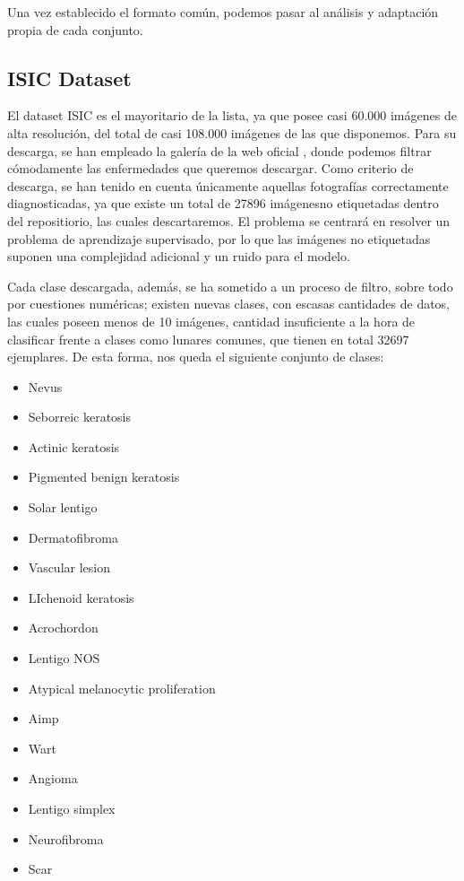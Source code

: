 Una vez establecido el formato común, podemos pasar al análisis y adaptación propia de cada conjunto.

\subsection{ISIC Dataset}

El dataset ISIC es el mayoritario de la lista, ya que posee casi 60.000 imágenes de alta resolución, del total de casi 108.000 imágenes de las que disponemos. Para su descarga, se han empleado la galería de la web oficial \cite{isicarchive}, donde podemos filtrar cómodamente las enfermedades que queremos descargar. Como criterio de descarga, se han tenido en cuenta únicamente aquellas fotografías correctamente diagnosticadas, ya que existe un total de 27896 imágenesno etiquetadas dentro del repositiorio, las cuales descartaremos. El problema se centrará en resolver un problema de aprendizaje supervisado, por lo que las imágenes no etiquetadas suponen una complejidad adicional y un ruido para el modelo.

Cada clase descargada, además, se ha sometido a un proceso de filtro, sobre todo por cuestiones numéricas; existen nuevas clases, con escasas cantidades de datos, las cuales poseen menos de 10 imágenes, cantidad insuficiente a la hora de clasificar frente a clases como lunares comunes, que tienen en total 32697 ejemplares. De esta forma, nos queda el siguiente conjunto de clases:
\begin{itemize}
	\item Nevus
	\item Seborreic keratosis            
	 \item Actinic keratosis            
	\item Pigmented benign keratosis         
	\item Solar lentigo                           
	\item Dermatofibroma                          
	\item Vascular lesion                         
	\item LIchenoid keratosis                     
	\item Acrochordon                             
	\item Lentigo NOS                             
	\item Atypical melanocytic proliferation       
	\item Aimp                                     
	\item 	Wart                                     
	\item Angioma                                  
	\item Lentigo simplex                          
	\item 	Neurofibroma                             
	 \item 	Scar 
\end{itemize}

